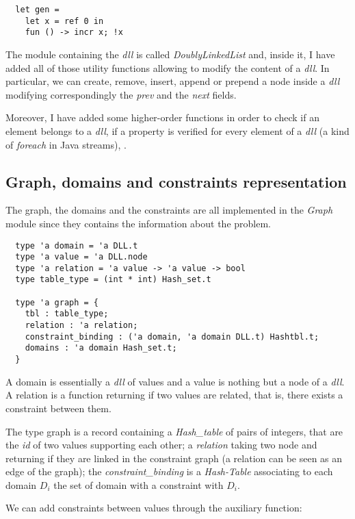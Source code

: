 \documentclass{rapport}
\begin{document}
\begin{verbatim}
  let gen =
    let x = ref 0 in
    fun () -> incr x; !x
\end{verbatim}

The module containing the \textit{dll} is called \textit{DoublyLinkedList} and, inside it, I have added all of those utility functions allowing to modify the content of a \textit{dll}. In particular, we can create, remove, insert, append or prepend a node inside a \textit{dll} modifying correspondingly the \textit{prev} and the \textit{next} fields.

Moreover, I have added some higher-order functions in order to check if an element belongs to a \textit{dll}, if a property is verified for every element of a \textit{dll} (a kind of \textit{foreach} in Java streams), \etc.

\subsection{Graph, domains and constraints representation}

The graph, the domains and the constraints are all implemented in the \textit{Graph} module since they contains the information about the problem.

\begin{verbatim}
  type 'a domain = 'a DLL.t
  type 'a value = 'a DLL.node
  type 'a relation = 'a value -> 'a value -> bool
  type table_type = (int * int) Hash_set.t

  type 'a graph = {
    tbl : table_type;
    relation : 'a relation;
    constraint_binding : ('a domain, 'a domain DLL.t) Hashtbl.t;
    domains : 'a domain Hash_set.t;
  }
\end{verbatim}

A domain is essentially a \textit{dll} of values and a value is nothing but a node of a \textit{dll}. A relation is a function returning if two values are related, that is, there exists a constraint between them.

The type graph is a record containing a \textit{Hash\_table} of pairs of integers, that are the \textit{id} of two values supporting each other; a \textit{relation} taking two node and returning if they are linked in the constraint graph (a relation can be seen as an edge of the graph); the \textit{constraint\_binding} is a \textit{Hash-Table} associating to each domain $D_i$ the set of domain with a constraint with $D_i$.

We can add constraints between values through the auxiliary function:
\end{document}
